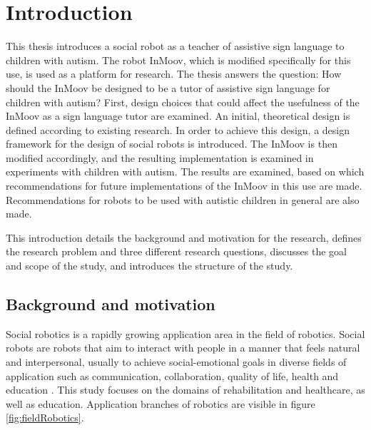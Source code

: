 \chapter{Introduction}
\label{chapter:intro}


This thesis introduces a social robot as a teacher of assistive sign language to children with autism. The robot InMoov, which is modified specifically for this use, is used as a platform for research. The thesis answers the question: How should the InMoov be designed to be a tutor of assistive sign language for children with autism? First, design choices that could affect the usefulness of the InMoov as a sign language tutor are examined. An initial, theoretical design is defined according to existing research. In order to achieve this design, a design framework for the design of social robots is introduced. The InMoov is then modified accordingly, and the resulting implementation is examined in experiments with children with autism. The results are examined, based on which recommendations for future implementations of the InMoov in this use are made. Recommendations for robots to be used with autistic children in general are also made.

This introduction details the background and motivation for the research, defines the research problem and three different research questions, discusses the goal and scope of the study, and introduces the structure of the study.



\section{Background and motivation}


Social robotics is a rapidly growing application area in the field of robotics. Social robots are robots that aim to interact with people in a manner that feels natural and interpersonal, usually to achieve social-emotional goals in diverse fields of application such as communication, collaboration, quality of life, health and education \cite{Breazeal2008}. This study focuses on the domains of rehabilitation and healthcare, as well as education. Application branches of robotics are visible in figure \ref{fig:fieldRobotics}.

